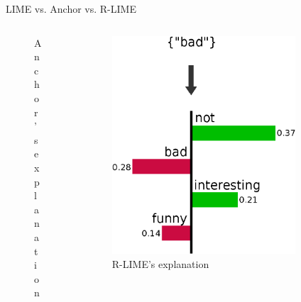 \documentclass[unicode]{beamer}
\begin{document}
\begin{frame}
\begin{columns}[t]
\begin{column}{.97\linewidth}
\begin{block}{LIME vs. Anchor vs. R-LIME}
\begin{columns}
\begin{column}{\lcol\textwidth}
\begin{columns}[]
\begin{column}{\lcol\textwidth}
\begin{figure}
									\vspace{-0.3em}
									\caption{Anchor's explanation}
								\end{figure}
							\end{column}
							\begin{column}{\rcol\textwidth}
								\begin{figure}
									\includegraphics[width=\textwidth]{src/img/example-rlime}
									\caption{R-LIME's explanation}
								\end{figure}
							\end{column}
						\end{columns}
					\end{column}
					\vrule{}
					\begin{column}{\ccol\textwidth}
						\vspace{-0.5em}
						\begin{figure}

\end{figure}
\end{column}
\end{columns}
\end{block}
\end{column}
\end{columns}
\end{frame}
\end{document}
